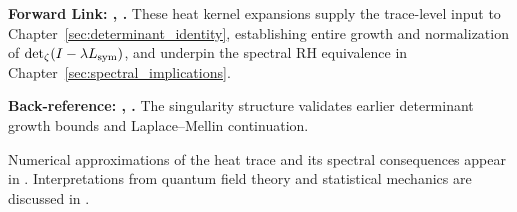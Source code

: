 \medskip

\noindent\textbf{Forward Link: , .}  
These heat kernel expansions supply the trace-level input to Chapter~\ref{sec:determinant_identity}, establishing entire growth and normalization of \( \det\nolimits_{\zeta}(I - \lambda L_{\mathrm{sym}}) \), and underpin the spectral RH equivalence in Chapter~\ref{sec:spectral_implications}.

\medskip

\noindent\textbf{Back-reference: , .}  
The singularity structure validates earlier determinant growth bounds and Laplace–Mellin continuation.

\medskip

\noindent
Numerical approximations of the heat trace and its spectral consequences appear in . Interpretations from quantum field theory and statistical mechanics are discussed in .
